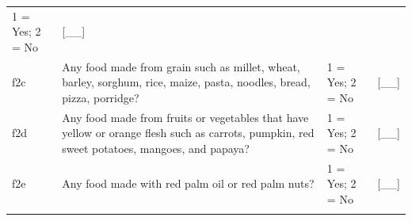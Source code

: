 \documentclass[12pt,a4paper]{book}
\theoremstyle{definition}
\theoremstyle{definition}
\theoremstyle{definition}
\theoremstyle{remark}
\begin{document}
\begin{longtable}[]{@{}llll@{}}
\begin{minipage}[t]{0.25\columnwidth}
1 = Yes; 2 = No\strut
\end{minipage} & \begin{minipage}[t]{0.13\columnwidth}\raggedright
{[}\_\_{]}\strut
\end{minipage}\tabularnewline
\begin{minipage}[t]{0.09\columnwidth}\raggedright
f2c\strut
\end{minipage} & \begin{minipage}[t]{0.41\columnwidth}\raggedright
Any food made from grain such as millet, wheat, barley, sorghum, rice,
maize, pasta, noodles, bread, pizza, porridge?\strut
\end{minipage} & \begin{minipage}[t]{0.25\columnwidth}\raggedright
1 = Yes; 2 = No\strut
\end{minipage} & \begin{minipage}[t]{0.13\columnwidth}\raggedright
{[}\_\_{]}\strut
\end{minipage}\tabularnewline
\begin{minipage}[t]{0.09\columnwidth}\raggedright
f2d\strut
\end{minipage} & \begin{minipage}[t]{0.41\columnwidth}\raggedright
Any food made from fruits or vegetables that have yellow or orange flesh
such as carrots, pumpkin, red sweet potatoes, mangoes, and papaya?\strut
\end{minipage} & \begin{minipage}[t]{0.25\columnwidth}\raggedright
1 = Yes; 2 = No\strut
\end{minipage} & \begin{minipage}[t]{0.13\columnwidth}\raggedright
{[}\_\_{]}\strut
\end{minipage}\tabularnewline
\begin{minipage}[t]{0.09\columnwidth}\raggedright
f2e\strut
\end{minipage} & \begin{minipage}[t]{0.41\columnwidth}\raggedright
Any food made with red palm oil or red palm nuts?\strut
\end{minipage} & \begin{minipage}[t]{0.25\columnwidth}\raggedright
1 = Yes; 2 = No\strut
\end{minipage} & \begin{minipage}[t]{0.13\columnwidth}\raggedright
{[}\_\_{]}\strut
\end{minipage}\tabularnewline
\begin{minipage}[t]{0.09\columnwidth}\raggedright

\end{minipage}
\end{longtable}
\end{document}
